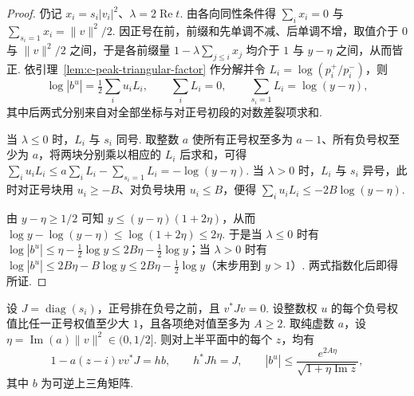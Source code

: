 \begin{proof}
仍记 $x_i=s_i|v_i|^2$、$\lambda=2\operatorname{Re}t$. 由各向同性条件得 $\sum_i x_i=0$ 与 $\sum_{s_i=1}x_i=\|v\|^2/2$. 因正号在前，前缀和先单调不减、后单调不增，取值介于 $0$ 与 $\|v\|^2/2$ 之间，于是各前缀量 $1-\lambda\sum_{j\le i}x_j$ 均介于 $1$ 与 $y-\eta$ 之间，从而皆正. 依引理~\ref{lem:c-peak-triangular-factor} 作分解并令 $L_i=\log(p_i^+/p_i^-)$，则
\[
 \log|b^u|=\tfrac12\sum_i u_iL_i,\qquad
 \sum_i L_i=0,\qquad
 \sum_{s_i=1}L_i=\log(y-\eta),
\]
其中后两式分别来自对全部坐标与对正号初段的对数差裂项求和.

当 $\lambda\le0$ 时，$L_i$ 与 $s_i$ 同号. 取整数 $a$ 使所有正号权至多为 $a-1$、所有负号权至少为 $a$，将两块分别乘以相应的 $L_i$ 后求和，可得 $\sum_i u_iL_i\le a\sum_i L_i-\sum_{s_i=1}L_i=-\log(y-\eta)$. 当 $\lambda>0$ 时，$L_i$ 与 $s_i$ 异号，此时对正号块用 $u_i\ge-B$、对负号块用 $u_i\le B$，便得 $\sum_i u_iL_i\le-2B\log(y-\eta)$.

由 $y-\eta\ge1/2$ 可知 $y\le(y-\eta)(1+2\eta)$，从而 $\log y-\log(y-\eta)\le\log(1+2\eta)\le2\eta$. 于是当 $\lambda\le0$ 时有 $\log|b^u|\le\eta-\frac12\log y\le2B\eta-\frac12\log y$；当 $\lambda>0$ 时有 $\log|b^u|\le2B\eta-B\log y\le2B\eta-\frac12\log y$（末步用到 $y>1$）. 两式指数化后即得所证.
\end{proof}

\begin{lemma}[复平延沿上半平面的三角权估计]
\label{lem:c-peak-triangular-upper}
\emitthmsource
设 $J=\operatorname{diag}(s_i)$，正号排在负号之前，且 $v^*Jv=0$. 设整数权 $u$ 的每个负号权值比任一正号权值至少大 $1$，且各项绝对值至多为 $A\ge2$. 取纯虚数 $a$，设 $\eta=\operatorname{Im}(a)\|v\|^2\in(0,1/2]$. 则对上半平面中的每个 $z$，均有
\[
 1-a(z-i)v v^*J=hb,\qquad h^*Jh=J,\qquad
             |b^u|\le\frac{e^{2A\eta}}{\sqrt{1+\eta\operatorname{Im}z}},
\]
其中 $b$ 为可逆上三角矩阵.
\end{lemma}

